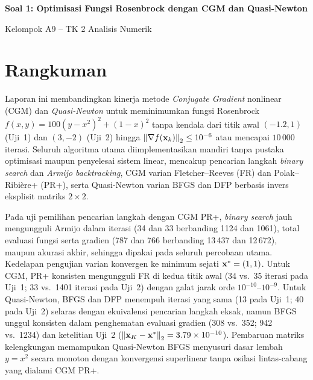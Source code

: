\documentclass[12pt,a4paper]{article}
\begin{document}
\begin{center}
{\Large\bfseries Soal 1: Optimisasi Fungsi Rosenbrock dengan CGM dan Quasi-Newton}\par\medskip
Kelompok A9 -- TK 2 Analisis Numerik
\end{center}

\section*{Rangkuman}
Laporan ini membandingkan kinerja metode \emph{Conjugate Gradient} nonlinear (CGM) dan \emph{Quasi-Newton} untuk
meminimumkan fungsi Rosenbrock $f(x,y)=100(y-x^2)^2+(1-x)^2$ tanpa kendala dari titik awal $(-1.2,1)$ (Uji~1) dan
$(3,-2)$ (Uji~2) hingga $\left\lVert \nabla f(\mathbf{x}_k)\right\rVert_2\le10^{-6}$ atau mencapai $10\,000$ iterasi. Seluruh algoritma utama
diimplementasikan mandiri tanpa pustaka optimisasi maupun penyelesai sistem linear, mencakup pencarian langkah
\emph{binary search} dan \emph{Armijo backtracking}, CGM varian Fletcher--Reeves (FR) dan Polak--Ribi\`ere+ (PR+),
serta Quasi-Newton varian BFGS dan DFP berbasis invers eksplisit matriks $2\times2$.

Pada uji pemilihan pencarian langkah dengan CGM PR+, \emph{binary search} jauh mengungguli Armijo dalam iterasi (34 dan
33 berbanding 1124 dan 1061), total evaluasi fungsi serta gradien (787 dan 766 berbanding 13\,437 dan 12\,672), maupun
akurasi akhir, sehingga dipakai pada seluruh percobaan utama. Kedelapan pengujian varian konvergen ke minimum sejati
$\mathbf{x}^*=(1,1)$. Untuk CGM, PR+ konsisten mengungguli FR di kedua titik awal (34 vs.\ 35 iterasi pada Uji~1; 33 vs.\
1401 iterasi pada Uji~2) dengan galat jarak orde $10^{-10}$--$10^{-9}$. Untuk Quasi-Newton, BFGS dan DFP menempuh
iterasi yang sama (13 pada Uji~1; 40 pada Uji~2) selaras dengan ekuivalensi pencarian langkah eksak, namun BFGS unggul
konsisten dalam penghematan evaluasi gradien (308 vs.\ 352; 942 vs.\ 1234) dan ketelitian Uji~2
($\left\lVert \mathbf{x}_K-\mathbf{x}^*\right\rVert_2=3.79\times10^{-10}$). Pembaruan matriks kelengkungan memampukan Quasi-Newton BFGS menyusuri dasar
lembah $y=x^2$ secara monoton dengan konvergensi superlinear tanpa osilasi lintas-cabang yang dialami CGM PR+.

\setcounter{tocdepth}{1}
\tableofcontents
\clearpage

\end{document}
